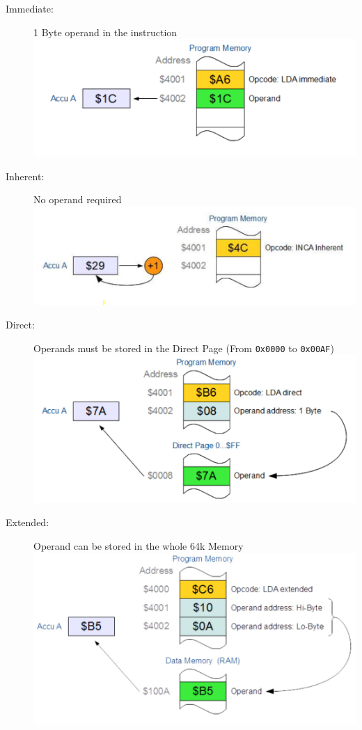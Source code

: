 \documentclass[a4paper, 11pt, nofootinbib]{book}
\newcommand{\code}[1]{\texttt{#1}}
\begin{document}
\begin{description}
	\item[Immediate: ] 1 Byte operand in the instruction \\
		\includegraphics[keepaspectratio=true, height=10\baselineskip]{immAdd.PNG}
	\item[Inherent: ] No operand required \\
		\includegraphics[keepaspectratio=true, height=10\baselineskip]{inhAdd.PNG}
	\item[Direct: ] Operands must be stored in the Direct Page (From \code{0x0000} to \code{0x00AF}) \\
		\includegraphics[keepaspectratio=true, height=10\baselineskip]{dirAdd.PNG}
	\item[Extended: ] Operand can be stored in the whole 64k Memory \\	
		\includegraphics[keepaspectratio=true, height=10\baselineskip]{extAdd.PNG}

\end{description}
\end{document}
